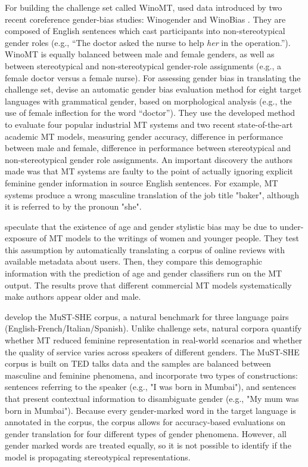 For building the challenge set called WinoMT, \citet{Stanovsky_2019} used data introduced by two recent coreference gender-bias studies: Winogender \parencite{Rudinger_2018_coreference} and WinoBias \parencite{Zhao_2018_coreference}. They are composed of English sentences which cast participants into non-stereotypical gender roles (e.g., “The doctor asked the nurse to help \textit{her} in the operation.”). WinoMT is equally balanced between male and female genders, as well as between stereotypical and non-stereotypical gender-role assignments (e.g., a female doctor versus a female nurse). 
For assessing gender bias in translating the challenge set, \citet{Stanovsky_2019} devise an automatic gender bias evaluation method for eight target languages with grammatical gender, based on morphological analysis (e.g., the use of female inflection for the word “doctor”). They use the developed method to evaluate four popular industrial MT systems and two recent state-of-the-art academic MT models, measuring gender accuracy, difference in performance between male and female, difference in performance between stereotypical and non-stereotypical gender role assignments. An important discovery the authors made was that MT systems are faulty to the point of actually ignoring explicit feminine gender information in source English sentences. For example, MT systems produce a wrong masculine translation of the job title "baker", although it is referred to by the pronoun "she".

\citet{Hovy_2020} speculate that the existence of age and gender stylistic bias may be due to under-exposure of MT models to the writings of women and younger people. They test this assumption by automatically translating a corpus of online reviews with available metadata about users. Then, they compare this demographic information with the prediction of age and gender classifiers run on the MT output. The results prove that different commercial MT models systematically make authors appear older and male.

\citet{MuST-SHE} develop the MuST-SHE corpus, a natural benchmark for three language pairs (English-French/Italian/Spanish). Unlike challenge sets, natural corpora quantify whether MT reduced feminine representation in real-world scenarios and whether the quality of service varies across speakers of different genders. The MuST-SHE corpus is built on  TED talks data and the samples are balanced between masculine and feminine phenomena, and incorporate two types of constructions: sentences referring to the speaker (e.g., "I was born in Mumbai"), and sentences that present contextual information to disambiguate gender (e.g., "My mum was born in Mumbai"). Because every gender-marked word in the target language is annotated in the corpus, the corpus allows for accuracy-based evaluations on gender translation for four different types of gender phenomena. However, all gender marked words are treated equally, so it is not possible to identify if the model is propagating stereotypical representations.

